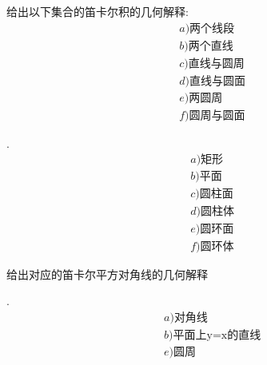\begin{exercise}
    给出以下集合的笛卡尔积的几何解释:
    \begin{align*}
        & a)\text{两个线段}\\
        & b)\text{两个直线}\\
        & c)\text{直线与圆周}\\
        & d)\text{直线与圆面}\\
        & e)\text{两圆周}\\
        & f)\text{圆周与圆面}
    \end{align*}
\end{exercise}
\begin{solution}.\\
    \begin{align*}
        & a)\text{矩形}\\
        & b)\text{平面}\\
        & c)\text{圆柱面}\\
        & d)\text{圆柱体}\\
        & e)\text{圆环面}\\
        & f)\text{圆环体}
    \end{align*}
\end{solution}
\begin{exercise}
    给出对应的笛卡尔平方对角线的几何解释
\end{exercise}
\begin{solution}.\\
    \begin{align*}
        &a)\text{对角线}\\
        &b)\text{平面上y=x的直线}\\
        &e)\text{圆周}
    \end{align*}
\end{solution}


